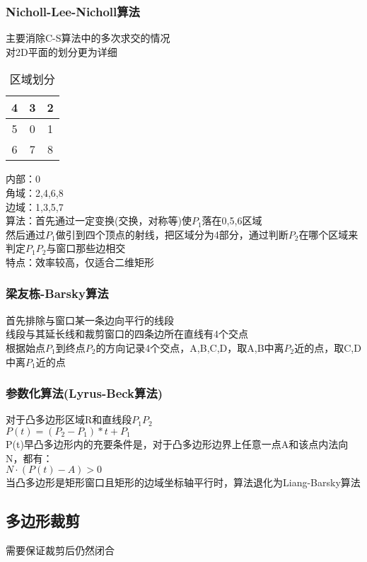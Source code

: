 \documentclass{article}
\begin{document}
\begin{CJK}{UTF8}{gbsn}
	\subsubsection{Nicholl-Lee-Nicholl算法}
	主要消除C-S算法中的多次求交的情况\\
	对2D平面的划分更为详细\\
	\begin{table}
	\centering
	\caption{区域划分}
	\begin{tabular}{|c|c|c|}
		\hline
		4&3&2\\
		\hline
		5&0&1\\
		\hline
		6&7&8\\
		\hline
	\end{tabular}
	\end{table}
	内部：0\\
	角域：2,4,6,8\\
	边域：1,3,5,7\\
	算法：首先通过一定变换(交换，对称等)使$P_1$落在0,5,6区域\\
	然后通过$P_1$做引到四个顶点的射线，把区域分为4部分，通过判断$P_2$在哪个区域来判定$P_1P_2$与窗口那些边相交\\
	特点：效率较高，仅适合二维矩形\\
	\subsubsection{梁友栋-Barsky算法}
	首先排除与窗口某一条边向平行的线段\\
	线段与其延长线和裁剪窗口的四条边所在直线有4个交点\\
	根据始点$P_1$到终点$P_2$的方向记录4个交点，A,B,C,D，取A,B中离$P_2$近的点，取C,D中离$P_1$近的点\\
	
	\subsubsection{参数化算法(Lyrus-Beck算法)}
	对于凸多边形区域R和直线段$P_1P_2$\\
	$P(t)=(P_2-P_1)*t+P_1$\\
	P(t)早凸多边形内的充要条件是，对于凸多边形边界上任意一点A和该点内法向N，都有：\\
	$N\cdot(P(t)-A)>0$\\
	当凸多边形是矩形窗口且矩形的边域坐标轴平行时，算法退化为Liang-Barsky算法\\
	\subsection{多边形裁剪}
	需要保证裁剪后仍然闭合\\

\end{CJK}
\end{document}
